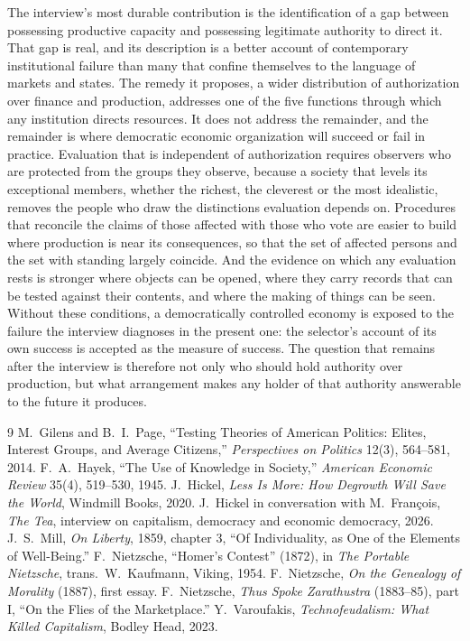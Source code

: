 \documentclass[12pt]{article}
\theoremstyle{definition}
\begin{document}
The interview's most durable contribution is the identification of a gap between possessing productive capacity and possessing legitimate authority to direct it. That gap is real, and its description is a better account of contemporary institutional failure than many that confine themselves to the language of markets and states. The remedy it proposes, a wider distribution of authorization over finance and production, addresses one of the five functions through which any institution directs resources. It does not address the remainder, and the remainder is where democratic economic organization will succeed or fail in practice. Evaluation that is independent of authorization requires observers who are protected from the groups they observe, because a society that levels its exceptional members, whether the richest, the cleverest or the most idealistic, removes the people who draw the distinctions evaluation depends on. Procedures that reconcile the claims of those affected with those who vote are easier to build where production is near its consequences, so that the set of affected persons and the set with standing largely coincide. And the evidence on which any evaluation rests is stronger where objects can be opened, where they carry records that can be tested against their contents, and where the making of things can be seen. Without these conditions, a democratically controlled economy is exposed to the failure the interview diagnoses in the present one: the selector's account of its own success is accepted as the measure of success. The question that remains after the interview is therefore not only who should hold authority over production, but what arrangement makes any holder of that authority answerable to the future it produces.

\begin{thebibliography}{9}
 M.~Gilens and B.~I.~Page, ``Testing Theories of American Politics: Elites, Interest Groups, and Average Citizens,'' \emph{Perspectives on Politics} 12(3), 564--581, 2014.
 F.~A.~Hayek, ``The Use of Knowledge in Society,'' \emph{American Economic Review} 35(4), 519--530, 1945.
 J.~Hickel, \emph{Less Is More: How Degrowth Will Save the World}, Windmill Books, 2020.
 J.~Hickel in conversation with M.~Fran\c{c}ois, \emph{The Tea}, interview on capitalism, democracy and economic democracy, 2026.
 J.~S.~Mill, \emph{On Liberty}, 1859, chapter 3, ``Of Individuality, as One of the Elements of Well-Being.''
 F.~Nietzsche, ``Homer's Contest'' (1872), in \emph{The Portable Nietzsche}, trans.\ W.~Kaufmann, Viking, 1954.
 F.~Nietzsche, \emph{On the Genealogy of Morality} (1887), first essay.
 F.~Nietzsche, \emph{Thus Spoke Zarathustra} (1883--85), part I, ``On the Flies of the Marketplace.''
 Y.~Varoufakis, \emph{Technofeudalism: What Killed Capitalism}, Bodley Head, 2023.
\end{thebibliography}
\end{document}
